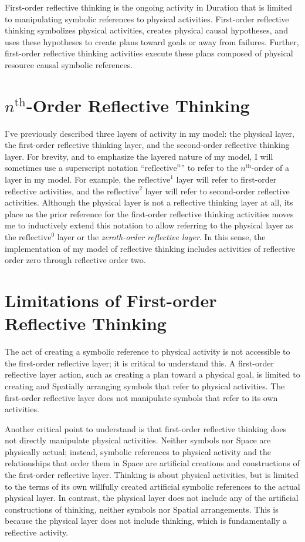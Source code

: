 First-order reflective thinking is the ongoing activity in Duration
that is limited to manipulating symbolic references to physical
activities.  First-order reflective thinking symbolizes physical
activities, creates physical causal hypotheses, and uses these
hypotheses to create plans toward goals or away from failures.
Further, first-order reflective thinking activities execute these
plans composed of physical resource causal symbolic references.

\section{$n^\text{th}$-Order Reflective Thinking}

I've previously described three layers of activity in my model: the
physical layer, the first-order reflective thinking layer, and the
second-order reflective thinking layer.  For brevity, and to emphasize
the layered nature of my model, I will sometimes use a superscript
notation ``$\text{reflective}^n$'' to refer to the $n^\text{th}$-order
of a layer in my model.  For example, the $\text{reflective}^1$ layer
will refer to first-order reflective activities, and the
$\text{reflective}^2$ layer will refer to second-order reflective
activities.  Although the physical layer is not a reflective thinking
layer at all, its place as the prior reference for the first-order
reflective thinking activities moves me to inductively extend this
notation to allow referring to the physical layer as the
$\text{reflective}^0$ layer or the \emph{zeroth-order reflective
  layer}.  In this sense, the implementation of my model of reflective
thinking includes activities of reflective order zero through
reflective order two.

\section{Limitations of First-order Reflective Thinking}

The act of creating a symbolic reference to physical activity is not
accessible to the first-order reflective layer; it is critical to
understand this.  A first-order reflective layer action, such as
creating a plan toward a physical goal, is limited to creating and
Spatially arranging symbols that refer to physical activities.  The
first-order reflective layer does not manipulate symbols that refer to
its own activities.

Another critical point to understand is that first-order reflective
thinking does not directly manipulate physical activities.  Neither
symbols nor Space are physically actual; instead, symbolic references
to physical activity and the relationships that order them in Space
are artificial creations and constructions of the first-order
reflective layer.  Thinking is about physical activities, but is
limited to the terms of its own willfully created artificial symbolic
references to the actual physical layer.  In contrast, the physical
layer does not include any of the artificial constructions of
thinking, neither symbols nor Spatial arrangements.  This is because
the physical layer does not include thinking, which is fundamentally a
reflective activity.

